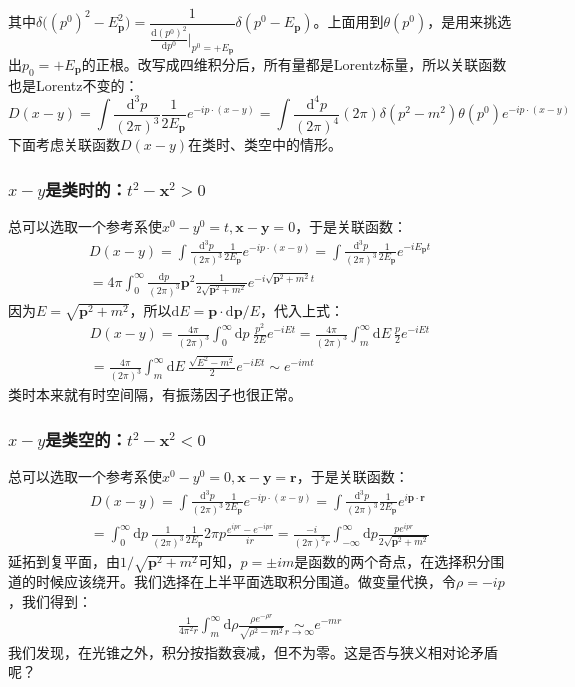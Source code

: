 \documentclass{book}
\begin{document}
其中$\delta\Big({(p^0)}^2-E_\mathbf{p}^2\Big)=\dfrac{1}{\frac{\mathrm{d}(p^0)^2}{\mathrm{d}p^0}|_{p^0=+E_\mathbf{p}}}\delta(p^0-E_\mathbf{p})$。上面用到$\theta(p^0)$，是用来挑选出$p_0=+ E_\mathbf{p}$的正根。改写成四维积分后，所有量都是Lorentz标量，所以关联函数也是Lorentz不变的：
$$
D(x-y)={\int\frac{\mathrm{d}^3p}{(2\pi)^3}\frac1{2E_{\mathbf{p}}}e^{-ip\cdot(x-y)}}=\int\frac{\mathrm{d}^4p}{(2\pi)^4}(2\pi)\delta(p^2-m^2)\theta(p^0)e^{-ip\cdot(x-y)}
$$
下面考虑关联函数$D(x-y)$在类时、类空中的情形。
\subsubsection{$x-y$是类时的：$t^2-\mathbf{x}^2>0$}
总可以选取一个参考系使$x^0-y^0=t,\mathbf{x}-\mathbf{y}=0$，于是关联函数：
\begin{gather*}
D(x-y)={\int\frac{\mathrm{d}^3p}{(2\pi)^3}\frac1{2E_{\mathbf{p}}}e^{-ip\cdot(x-y)}}={\int\frac{\mathrm{d}^3p}{(2\pi)^3}\frac1{2E_{\mathbf{p}}}e^{-iE_{\mathbf{p}}t}}\\=4\pi\int_0^\infty\frac{\mathrm{d}p}{(2\pi)^3}\mathbf{p}^2\frac{1}{2\sqrt{\mathbf{p}^2+m^2}}e^{-i\sqrt{\mathbf{p}^2+m^2}t}
\end{gather*}
因为$E=\sqrt{\mathbf{p}^2+m^2}$，所以$\mathrm{d}E=\mathbf{p}\cdot\mathrm{d}\mathbf{p}/E$，代入上式：
\begin{gather*}
D(x-y)=\frac{4\pi}{(2\pi)^3}\int_0^\infty\mathrm{d}p\ \frac{p^2}{2E}e^{-iEt}=\frac{4\pi}{(2\pi)^3}\int_m^\infty\mathrm{d}E\ \frac{p}{2}e^{-iEt} \\
=\frac{4\pi}{(2\pi)^3}\int_m^\infty\mathrm{d}E\ \frac{\sqrt{E^2-m^2}}{2}e^{-iEt}\sim e^{-imt}
\end{gather*}
类时本来就有时空间隔，有振荡因子也很正常。
\subsubsection{$x-y$是类空的：$t^2-\mathbf{x}^2<0$}
总可以选取一个参考系使$x^0-y^0=0,\mathbf{x}-\mathbf{y}=\mathbf{r}$，于是关联函数：
\begin{gather*}
    D(x-y)={\int\frac{\mathrm{d}^3p}{(2\pi)^3}\frac1{2E_{\mathbf{p}}}e^{-ip\cdot(x-y)}}={\int\frac{\mathrm{d}^3p}{(2\pi)^3}\frac1{2E_{\mathbf{p}}}e^{i\mathbf{p}\cdot\mathbf{r}}}\\=\int_0^\infty\mathrm{d}p\ \frac{1}{(2\pi)^3}\frac{1}{2E_\mathbf{p}}2\pi p\frac{e^{ipr}-e^{-ipr}}{ir}=\frac{-i}{(2\pi)^2r}\int_{-\infty}^\infty\mathrm{d}p\frac{pe^{ipr}}{2\sqrt{\mathbf{p}^2+m^2}}
\end{gather*}
延拓到复平面，由$1/\sqrt{\mathbf{p}^2+m^2}$可知，$p=\pm im$是函数的两个奇点，在选择积分围道的时候应该绕开。我们选择在上半平面选取积分围道。做变量代换，令$\rho=-ip$，我们得到：
$$
\begin{aligned}\frac{1}{4\pi^2r}\int_{{m}}^{\infty}\mathrm{d}\rho\frac{\rho e^{-\rho r}}{\sqrt{\rho^2-m^2}}\operatorname*{\sim}_{r\to\infty}e^{-mr}\end{aligned}
$$
我们发现，在光锥之外，积分按指数衰减，但不为零。这是否与狭义相对论矛盾呢？
\end{document}
